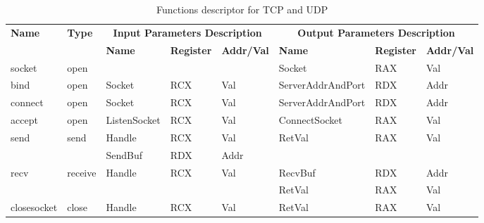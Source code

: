 \begin{table}[H]
  \centering
  \caption{Functions descriptor for TCP and UDP}
  \label{tcpupdfunctions}
\begin{tabular}{|l|l|l|l|l|l|l|l|}
\hline
             \multirow{2}{*}{{\textbf{Name}}} & \multirow{2}{*}{{\textbf{Type}}} & \multicolumn{3}{c|}{\textbf{Input Parameters Description}} & \multicolumn{3}{c|}{\textbf{Output Parameters Description}} \\
              \cline{3-8} 
             & & \textbf{Name}& \textbf{Register} & \textbf{Addr/Val} & \textbf{Name}& \textbf{Register} &  \textbf{Addr/Val}  \\
             \hline
      socket
       &open &  &   &  &  Socket & RAX & Val\\ 
      \hline
      bind
       &open & Socket &  RCX & Val &  ServerAddrAndPort & RDX & Addr\\
      \hline   
            connect
       &open & Socket &  RCX & Val &  ServerAddrAndPort & RDX & Addr\\
      \hline   
     accept
       &open &  ListenSocket & RCX & Val & ConnectSocket & RAX & Val\\
      \hline                    
      \multirow{2}{*}{send}
       &\multirow{2}{*}{send} &  Handle & RCX & Val & \multirow{2}{*}{RetVal}& \multirow{2}{*}{RAX} & \multirow{2}{*}{Val} \\
       \cline{3-5}
      & & SendBuf& RDX&Addr &  &  & \\
      \hline            
      \multirow{2}{*}{recv}
       &\multirow{2}{*}{receive}&  \multirow{2}{*}{Handle} & \multirow{2}{*}{RCX} & \multirow{2}{*}{Val}& RecvBuf& RDX&Addr\\
       \cline{6-8}
      & &  &   &  &  RetVal & RAX & Val\\ 
      \hline      
      closesocket &
       close &  Handle & RCX & Val & RetVal & RAX & Val\\
      \hline                          
  \end{tabular}    
\end{table}

